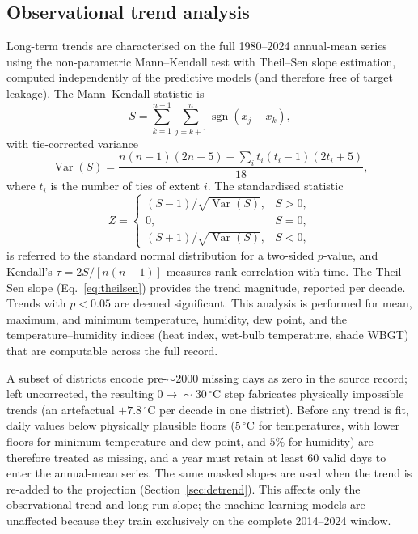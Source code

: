 \documentclass[review,11pt]{elsarticle}
\newcommand{\degC}{\ensuremath{^{\circ}\mathrm{C}}}
\begin{document}
\subsection{Observational trend analysis}\label{sec:trend}
Long-term trends are characterised on the full 1980--2024 annual-mean series
using the non-parametric Mann--Kendall test with Theil--Sen slope estimation,
computed independently of the predictive models (and therefore free of target
leakage). The Mann--Kendall statistic is
\begin{equation}
S=\sum_{k=1}^{n-1}\sum_{j=k+1}^{n}\operatorname{sgn}(x_j-x_k),
\end{equation}
with tie-corrected variance
\begin{equation}
\operatorname{Var}(S)=\frac{n(n-1)(2n+5)-\sum_{i} t_i(t_i-1)(2t_i+5)}{18},
\end{equation}
where $t_i$ is the number of ties of extent $i$. The standardised statistic
\begin{equation}
Z=\begin{cases}
(S-1)/\sqrt{\operatorname{Var}(S)}, & S>0,\\
0, & S=0,\\
(S+1)/\sqrt{\operatorname{Var}(S)}, & S<0,
\end{cases}
\end{equation}
is referred to the standard normal distribution for a two-sided $p$-value, and
Kendall's $\tau=2S/[n(n-1)]$ measures rank correlation with time. The Theil--Sen
slope (Eq.~\ref{eq:theilsen}) provides the trend magnitude, reported per decade.
Trends with $p<0.05$ are deemed significant. This analysis is performed for mean,
maximum, and minimum temperature, humidity, dew point, and the
temperature--humidity indices (heat index, wet-bulb temperature, shade WBGT)
that are computable across the full record.

A subset of districts encode pre-$\sim$2000 missing days as zero in the source
record; left uncorrected, the resulting $0\rightarrow\sim\!30\,\degC$ step
fabricates physically impossible trends (an artefactual $+7.8\,\degC$ per decade
in one district). Before any trend is fit, daily values below physically
plausible floors ($5\,\degC$ for temperatures, with lower floors for minimum
temperature and dew point, and $5\%$ for humidity) are therefore treated as
missing, and a year must retain at least 60 valid days to enter the annual-mean
series. The same masked slopes are used when the trend is re-added to the
projection (Section~\ref{sec:detrend}). This affects only the observational
trend and long-run slope; the machine-learning models are unaffected because they
train exclusively on the complete 2014--2024 window.
\end{document}
